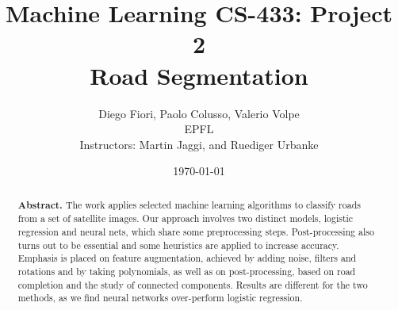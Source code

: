 \documentclass[%
 reprint,
 amsmath,amssymb,
 aps,
]{revtex4-1}
\begin{document}

\title{Machine Learning CS-433: Project 2\\Road Segmentation}%

\author{Diego Fiori, Paolo Colusso, Valerio Volpe\\
EPFL\\
Instructors: Martin Jaggi, and Ruediger Urbanke}



\date{\today}%

\begin{abstract}

\textbf{Abstract.} The work applies selected machine learning algorithms to classify roads from a set of satellite images. Our approach involves two distinct models, logistic regression and neural nets, which share some preprocessing steps. Post-processing also turns out to be essential and some heuristics are applied to increase accuracy.  Emphasis is placed on feature augmentation, achieved by adding noise, filters and rotations and by taking polynomials, as well as on post-processing, based on road completion and the study of connected components. Results are different for the two methods, as we find neural networks over-perform logistic regression.
\end{abstract}

\maketitle

\end{document}

